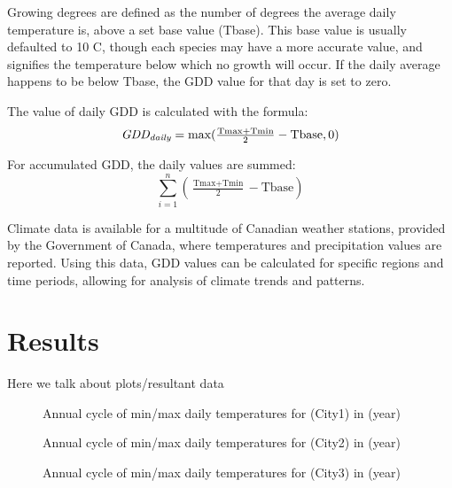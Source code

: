 \documentclass[12pt]{article}
\begin{document}
Growing degrees are defined as the number of degrees the average daily 
temperature is, above a set base value (Tbase). This base value is 
usually defaulted to 10 \degree C, though each species may have a more 
accurate value, and signifies the temperature below which no growth 
will occur. If the daily average happens to be below Tbase, the GDD 
value for that day is set to zero. \\

\bigskip
\par

The value of daily GDD is calculated with the formula:
$$
\textit{GDD\textsubscript{daily}} =  \text{max}( \tfrac{\text{Tmax}+\text{Tmin}}{2}-\text{Tbase}, 0)
$$

\bigskip
\bigskip

For accumulated GDD, the daily values are summed:
$$
\sum_{i=1}^n ( \tfrac{\text{Tmax}+\text{Tmin}}{2}-\text{Tbase})
$$

\bigskip

\par
Climate data is available for a multitude of Canadian weather stations, provided
by the Government of Canada, where temperatures and precipitation values are reported. 
Using this data, GDD values can be calculated for 
specific regions and time periods, allowing for analysis of climate trends and patterns. 

\pagebreak

\section{Results}\label{data analysis}
Here we talk about plots/resultant data

\begin{figure}[!htbp]
\centering
\caption{\scriptsize Annual cycle of min/max daily temperatures for (City1) in (year)}
\label{Label}		  
\end{figure}
		
\begin{figure}[!htbp]
\centering
\caption{\scriptsize Annual cycle of min/max daily temperatures for (City2) in (year)}
\label{Label}		  
\end{figure}
		
\begin{figure}[!htbp]
\centering
\caption{\scriptsize Annual cycle of min/max daily temperatures for (City3) in (year)}
\label{Label}		  
\end{figure}
\end{document}
